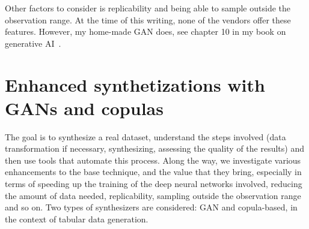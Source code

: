 \documentclass[oneside,10pt]{book}
\begin{document}
Other factors to consider is replicability and being able to sample outside the observation range. At the time of this writing, 
none of the vendors offer these features. However, my home-made GAN does, see chapter 10 in my book on generative AI~\cite{vgelsevier}.
 

\begin{table}[H]
\begin{center}
\caption{\label{ycpuj3eure} Insurance data, distances to validation set}
\end{center}
\end{table}



\section{Enhanced synthetizations with GANs and copulas}\label{porgan2}


The goal is to synthesize a real dataset, understand the steps involved (data transformation if necessary, synthesizing, assessing the quality of the results) and then use tools that automate this process. Along the way, we investigate various enhancements to the base technique, and the value that they bring, especially in terms of speeding up the training of the deep neural networks involved, reducing the amount of data needed, replicability, sampling outside the observation range and so on. Two types of synthesizers are considered: GAN and copula-based, in the context of tabular data generation.

\end{document}
